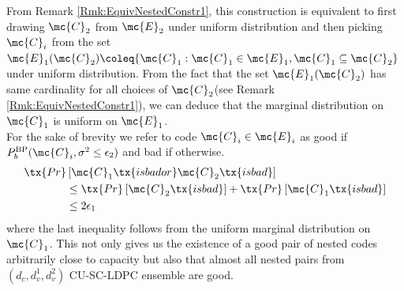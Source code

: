 \documentclass[journal]{IEEEtran}
\begin{document}
\begin{IEEEproof}
 From Remark \ref{Rmk:EquivNestedConstr1}, this construction is equivalent to first drawing $\mc{C}_{2}$ from $\mc{E}_{2}$ under uniform distribution and then picking $\mc{C}_{i}$ from the set $\mc{E}_{1}(\mc{C}_{2})\coleq \{\mc{C}_{1}:\mc{C}_{1}\in \mc{E}_{1},\mc{C}_{1}\subseteq \mc{C}_{2}\}$ under uniform distribution. From the fact that the set $\mc{E}_{1}(\mc{C}_{2})$ has same cardinality for all choices of $\mc{C}_{2}$(see Remark \ref{Rmk:EquivNestedConstr1}), we can deduce that the marginal distribution on $\mc{C}_{1}$ is uniform on $\mc{E}_{1}$.\\
 For the sake of brevity we refer to code $\mc{C}_{i}\in\mc{E}_{i}$ as good if $P_{b}^{\text{BP}}(\mc{C}_{i},\sigma^{2}\leq \epsilon_{2})$ and bad if otherwise. 
 \begin{align*}
\tx{Pr}&\left[\mc{C}_{1}  \tx{ is bad  or } \mc{C}_{2} \tx{ is bad }\right] \\
&\leq \tx{Pr}\left[\mc{C}_{2} \tx{ is bad} \right] +\tx{Pr}\left[\mc{C}_{1} \tx{ is bad}\right] \\
&\leq 2\epsilon_{1}
 \end{align*}
 where the last inequality follows from the uniform marginal distribution on $\mc{C}_{1}$. This not only gives us the existence of a good pair of nested codes arbitrarily close to capacity but also that almost all nested pairs from $(d_{c},d_{v}^{1},d_{v}^{2})$ CU-SC-LDPC ensemble are good.
\end{IEEEproof}
\end{document}
